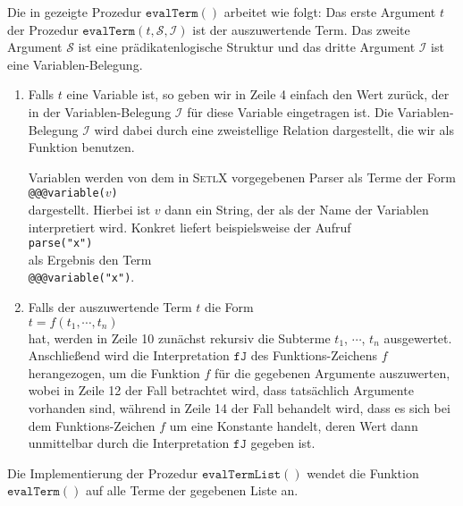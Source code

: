 Die in  gezeigte Prozedur $\texttt{evalTerm}()$ arbeitet wie folgt:
Das erste Argument $t$  der Prozedur $\texttt{evalTerm}(t, \mathcal{S}, \mathcal{I})$  ist der
auszuwertende Term. Das zweite Argument $\mathcal{S}$ ist eine pr\"{a}dikatenlogische 
Struktur und das dritte Argument $\mathcal{I}$ ist eine Variablen-Belegung.
\begin{enumerate}
\item Falls $t$ eine Variable ist, so geben wir in Zeile 4 einfach den Wert zur\"{u}ck, der in
      der Variablen-Belegung $\mathcal{I}$ f\"{u}r diese Variable eingetragen ist.  
      Die Variablen-Belegung $\mathcal{I}$ wird dabei durch eine
      zweistellige Relation dargestellt, die wir als Funktion benutzen.

      Variablen werden von dem in \textsc{SetlX} vorgegebenen Parser als Terme der Form
      \\[0.2cm]
      \hspace*{1.3cm}
      \texttt{@@@variable($v$)}
      \\[0.2cm]
      dargestellt.  Hierbei ist $v$ dann ein String, der als der Name der Variablen interpretiert wird.
      Konkret liefert beispielsweise der Aufruf
      \\[0.2cm]
      \hspace*{1.3cm}
      \texttt{parse("x")}
      \\[0.2cm]
      als Ergebnis den Term
      \\[0.2cm]
      \hspace*{1.3cm}
      \texttt{@@@variable("x")}.
\item Falls der auszuwertende Term $t$ die Form 
      \\[0.2cm]
      \hspace*{1.3cm}
      $t = f(t_1,\cdots,t_n)$
      \\[0.2cm]
      hat,  werden in Zeile 10 zun\"{a}chst rekursiv die 
      Subterme $t_1$, $\cdots$, $t_n$ ausgewertet.  Anschlie\ss{}end wird die Interpretation
      $\mathtt{fJ}$ des Funktions-Zeichens $f$ herangezogen, um die Funktion
      $f$ f\"{u}r die gegebenen
      Argumente auszuwerten, wobei in Zeile 12 der Fall betrachtet wird, dass tats\"{a}chlich Argumente
      vorhanden sind, w\"{a}hrend  in Zeile 14 der Fall behandelt wird, dass es sich bei dem
      Funktions-Zeichen $f$ um eine Konstante handelt, deren Wert dann unmittelbar durch
      die Interpretation $\mathtt{fJ}$ gegeben ist.
\end{enumerate}
Die Implementierung der Prozedur $\texttt{evalTermList}()$ wendet die Funktion
$\mathtt{evalTerm}()$ auf alle Terme der gegebenen Liste an.

